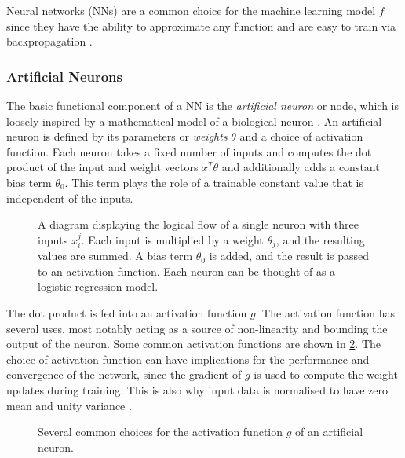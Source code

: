 Neural networks (NNs) are a common choice for the machine learning model $f$ since they have the ability to approximate any function \cite{HORNIK1989359} and are easy to train via backpropagation \cite{rumelhart1986learning}.

\subsubsection{Artificial Neurons}

The basic functional component of a NN is the \textit{artificial neuron} or node, which is loosely inspired by a mathematical model of a biological neuron \cite{mcculloch1943logical, hopfield1987neural}.
An artificial neuron is defined by its parameters or \textit{weights} $\theta$ and a choice of activation function.
Each neuron takes a fixed number of inputs and computes the dot product of the input and weight vectors $x^T \theta$ and additionally adds a constant bias term $\theta_0$.
This term plays the role of a trainable constant value that is independent of the inputs.

\begin{figure}[!htbp]
    \centering
    
    \caption{
      A diagram displaying the logical flow of a single neuron with three inputs $x_i^j$.
      Each input is multiplied by a weight $\theta_j$, and the resulting values are summed.
      A bias term $\theta_0$ is added, and the result is passed to an activation function.
      Each neuron can be thought of as a logistic regression model.
    }
    \label{fig:neuron}
\end{figure}

The dot product is fed into an activation function $g$.
The activation function has several uses, most notably acting as a source of non-linearity and bounding the output of the neuron.
Some common activation functions are shown in \cref{fig:activation_functions}.
The choice of activation function can have implications for the performance and convergence of the network, since the gradient of $g$ is used to compute the weight updates during training.
This is also why input data is normalised to have zero mean and unity variance \cite{lecun2012efficient}.

\begin{figure}[!htbp]
  \centering
  
  \caption{
    Several common choices for the activation function $g$ of an artificial neuron.
  }
  \label{fig:activation_functions}
\end{figure}


